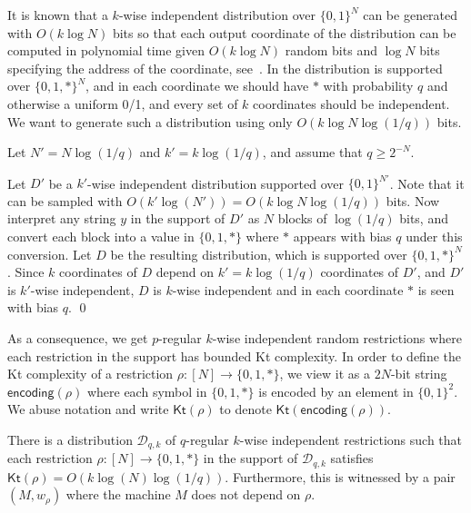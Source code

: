 \documentclass{toc}
\newcommand{\Kt}{\mathsf{Kt}}
\begin{document}
 It is known that a $k$-wise independent distribution over $\{0,1\}^N$ can be generated with $O(k\log N)$ bits so that each output coordinate of the distribution can be computed in polynomial time given $O(k\log N)$ random bits and $\log N$ bits specifying the address of the coordinate, see~\cite{DBLP:conf/stoc/CarterW77}. In  the distribution is supported over $\{0,1,*\}^N$, and in each coordinate we should have $*$ with probability $q$ and otherwise a uniform 0/1, and every set of $k$ coordinates should be independent. We want to generate such a distribution using only $O(k \log N \log (1/q))$ bits.

Let $N' = N \log (1/q)$ and $k' = k \log (1/q)$, and assume that $q\geq 2^{-N}$.

Let $D'$ be a $k'$-wise independent distribution supported over $\{0,1\}^{N'}$. Note that it can be sampled with $O(k'\log (N')) = O(k \log N \log(1/q))$ bits. Now interpret any string $y$ in the support of $D'$ as $N$ blocks of $\log(1/q)$ bits, and convert each block into a value in $\{0,1,*\}$ where $*$ appears with bias $q$ under this conversion. Let $D$ be the resulting distribution, which is supported over $\{0,1,*\}^N$. Since $k$ coordinates of $D$ depend on $k' = k \log(1/q)$ coordinates of $D'$, and $D'$ is $k'$-wise independent, $D$ is $k$-wise independent and in each coordinate $*$ is seen with bias $q$.  
\qed

\medskip
As a consequence, we get $p$-regular $k$-wise independent random restrictions where each restriction in the support has bounded Kt complexity. In order to define the Kt complexity of a restriction $\rho \colon [N] \to \{0,1,*\}$, we view it as a $2N$-bit string $\mathsf{encoding}(\rho)$ where each symbol in $\{0,1,*\}$ is encoded by an element in $\{0,1\}^2$. We abuse notation and write $\Kt(\rho)$ to denote $\Kt(\mathsf{encoding}(\rho))$.

\begin{proposition}\label{p:restriction_kt}
There is a distribution $\mathcal{D}_{q,k}$ of $q$-regular $k$-wise independent restrictions such that each restriction $\rho \colon [N] \to \{0,1,*\}$ in the support of $\mathcal{D}_{q,k}$ satisfies $\Kt(\rho) = O(k \log (N) \log (1/q))$. Furthermore, this is witnessed by a pair $(M,w_\rho)$ where the machine $M$ does not depend on $\rho$.  
\end{proposition}
\end{document}

